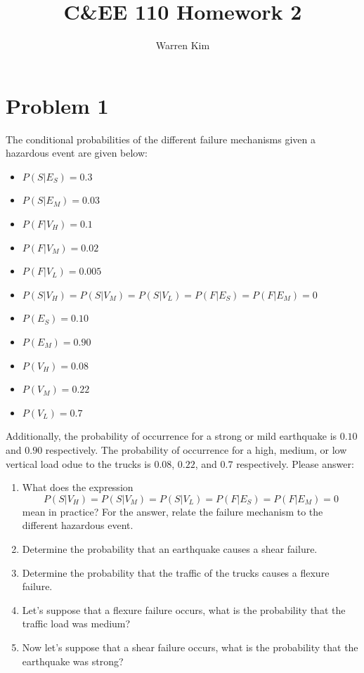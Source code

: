 \documentclass[13pt]{article}
\title{C\&EE 110 Homework 2}
\author{Warren Kim}
\begin{document}
\maketitle

\newpage
\section*{Problem 1}
The conditional probabilities of the different failure mechanisms
given a hazardous event are given below:
\begin{itemize}
\item $P(S|E_S) = 0.3$
\item $P(S|E_M) = 0.03$
\item $P(F|V_H) = 0.1$
\item $P(F|V_M) = 0.02$
\item $P(F|V_L) = 0.005$
\item $P(S|V_H) = P(S|V_M) = P(S|V_L) = P(F|E_S) = P(F|E_M) = 0$
\item $P(E_S) = 0.10$
\item $P(E_M) = 0.90$
\item $P(V_H) = 0.08$
\item $P(V_M) = 0.22$
\item $P(V_L) = 0.7$
\end{itemize}
Additionally, the probability of occurrence for a strong or mild
earthquake is $0.10$ and $0.90$ respectively. The probability of
occurrence for a high, medium, or low vertical load odue to the trucks
is $0.08$, $0.22$, and $0.7$ respectively. Please answer:

\begin{enumerate}[label=\textbf{\alph*.}]
\item What does the expression
  \[P(S|V_H) = P(S|V_M) = P(S|V_L) = P(F|E_S) = P(F|E_M) = 0\]
  mean in practice? For the answer, relate the failure mechanism to
  the different hazardous event.

\item Determine the probability that an earthquake causes a shear
  failure.

\item Determine the probability that the traffic of the trucks causes
  a flexure failure.

\item Let's suppose that a flexure failure occurs, what is the
  probability that the traffic load was medium?

\item Now let's suppose that a shear failure occurs, what is the
  probability that the earthquake was strong?
\end{enumerate}
\end{document}
